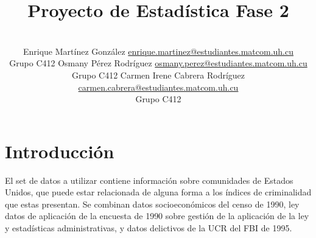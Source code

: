 \documentclass[a4paper,10pt,twocolumn]{article}
\title{Proyecto de Estadística Fase 2}
\author{\\
\name Enrique Martínez González \email \href{mailto:enrique.martinez@estudiantes.matcom.uh.cu}{enrique.martinez@estudiantes.matcom.uh.cu}
	\\ \addr Grupo C412 \AND
\name Osmany Pérez Rodríguez \email \href{mailto:osmany.perez@estudiantes.matcom.uh.cu}{osmany.perez@estudiantes.matcom.uh.cu}
  \\ \addr Grupo C412 \AND
\name Carmen Irene Cabrera Rodríguez \email \href{mailto:carmen.cabrera@estudiantes.matcom.uh.cu}{carmen.cabrera@estudiantes.matcom.uh.cu}
\\ \addr Grupo C412}
\begin{document}



\section{Introducción}\label{sec:intro}

	El set de datos a utilizar contiene información sobre comunidades de Estados Unidos, que puede estar relacionada de alguna forma a los índices de criminalidad que estas presentan. Se combinan datos socioeconómicos del censo de 1990, ley datos de aplicación de la encuesta de 1990 sobre gestión de la aplicación de la ley y estadísticas administrativas, y datos delictivos de la UCR del FBI de 1995.
	
\end{document}
